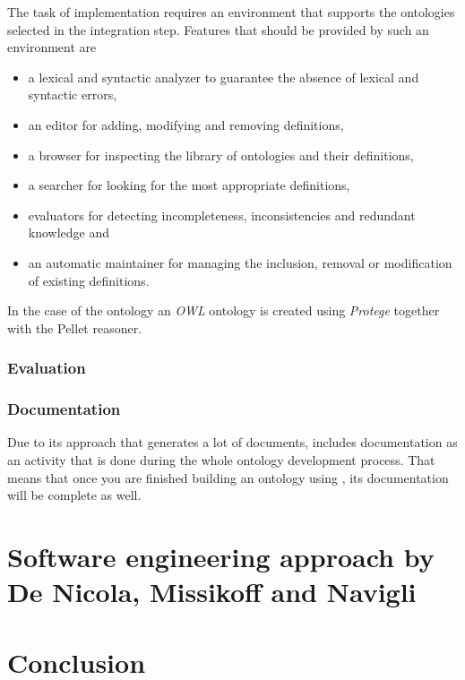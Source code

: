 The task of implementation requires an environment that supports the ontologies selected in the integration step. Features that should be provided by such an environment are

\begin{itemize}
  \item a lexical and syntactic analyzer to guarantee the absence of lexical and syntactic errors,
  \item an editor for adding, modifying and removing definitions,
  \item a browser for inspecting the library of ontologies and their definitions,
  \item a searcher for looking for the most appropriate definitions,
  \item evaluators for detecting incompleteness, inconsistencies and redundant knowledge and
  \item an automatic maintainer for managing the inclusion, removal or modification of existing definitions.
\end{itemize}
 

In the case of the \thinkhomeweather ontology an \emph{OWL} ontology is created using \emph{Protege} together with the Pellet reasoner.

\subsubsection{Evaluation}


\subsubsection{Documentation}

Due to its approach that generates a lot of documents, \methontology includes documentation as an activity that is done during the whole ontology development process. That means that once you are finished building an ontology using \methontology, its documentation will be complete as well.

\section{Software engineering approach by De Nicola, Missikoff and Navigli}

\section{Conclusion}

